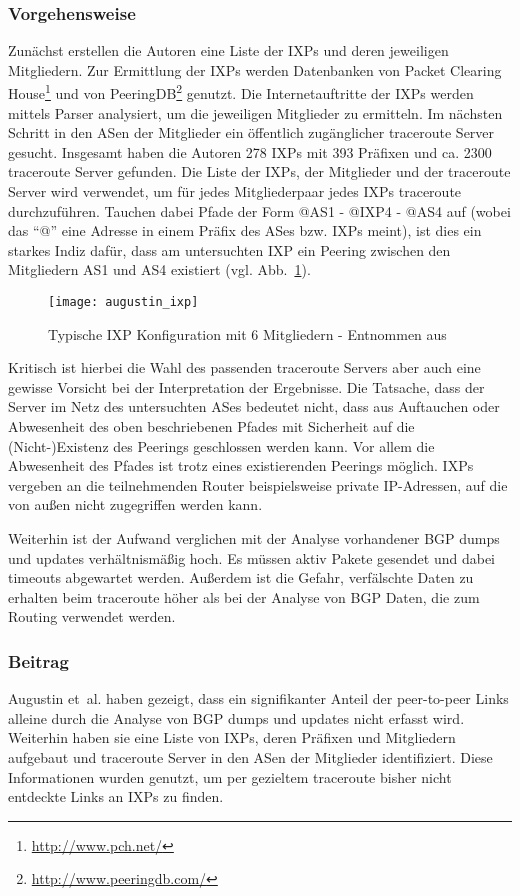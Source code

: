 \subsubsection{Vorgehensweise}
Zunächst erstellen die Autoren eine Liste der IXPs und deren jeweiligen Mitgliedern.
Zur Ermittlung der IXPs werden Datenbanken von Packet Clearing House\footnote{\url{http://www.pch.net/}} und von PeeringDB\footnote{\url{http://www.peeringdb.com/}} genutzt.
Die Internetauftritte der IXPs werden mittels Parser analysiert, um die jeweiligen Mitglieder zu ermitteln.
Im nächsten Schritt in den ASen der Mitglieder ein öffentlich zugänglicher traceroute Server gesucht.
Insgesamt haben die Autoren 278 IXPs mit 393 Präfixen und ca. 2300 traceroute Server gefunden.
Die Liste der IXPs, der Mitglieder und der traceroute Server wird verwendet, um für jedes Mitgliederpaar jedes IXPs traceroute durchzuführen.
Tauchen dabei Pfade der Form @AS1 - @IXP4 - @AS4 auf (wobei das "`@"' eine Adresse in einem Präfix des ASes bzw. IXPs meint), ist dies ein starkes Indiz dafür, dass am untersuchten IXP ein Peering zwischen den Mitgliedern AS1 und AS4 existiert (vgl. Abb.~\ref{fig:augustin_ixp}).
\begin{figure}
  \begin{center}
    \texttt{[image: augustin\_ixp]}
    \caption{Typische IXP Konfiguration mit 6 Mitgliedern - Entnommen aus~\cite{Augustin:2009:IM:1644893.1644934}}
    \label{fig:augustin_ixp}
  \end{center}
\end{figure}
Kritisch ist hierbei die Wahl des passenden traceroute Servers aber auch eine gewisse Vorsicht bei der Interpretation der Ergebnisse.
Die Tatsache, dass der Server im Netz des untersuchten ASes bedeutet nicht, dass aus Auftauchen oder Abwesenheit des oben beschriebenen Pfades mit Sicherheit auf die (Nicht-)Existenz des Peerings geschlossen werden kann.
Vor allem die Abwesenheit des Pfades ist trotz eines existierenden Peerings möglich.
IXPs vergeben an die teilnehmenden Router beispielsweise private IP-Adressen, auf die von außen nicht zugegriffen werden kann.

Weiterhin ist der Aufwand verglichen mit der Analyse vorhandener BGP dumps und updates verhältnismäßig hoch.
Es müssen aktiv Pakete gesendet und dabei timeouts abgewartet werden.
Außerdem ist die Gefahr, verfälschte Daten zu erhalten beim traceroute höher als bei der Analyse von BGP Daten, die zum Routing verwendet werden.

\subsubsection{Beitrag}
Augustin et~al. haben gezeigt, dass ein signifikanter Anteil der peer-to-peer Links alleine durch die Analyse von BGP dumps und updates nicht erfasst wird.
Weiterhin haben sie eine Liste von IXPs, deren Präfixen und Mitgliedern aufgebaut und traceroute Server in den ASen der Mitglieder identifiziert.
Diese Informationen wurden genutzt, um per gezieltem traceroute bisher nicht entdeckte Links an IXPs zu finden.
